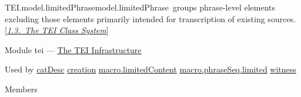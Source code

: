 \begin{reflist}
\item[]\begin{specHead}{TEI.model.limitedPhrase}{model.limitedPhrase} groups phrase-level elements excluding those elements primarily intended for transcription of existing sources. [\textit{\hyperref[STEC]{1.3.\ The TEI Class System}}]\end{specHead} 
    \item[{Module}]
  tei — \hyperref[ST]{The TEI Infrastructure}
    \item[{Used by}]
  \hyperref[TEI.catDesc]{catDesc} \hyperref[TEI.creation]{creation} \hyperref[TEI.macro.limitedContent]{macro.limitedContent} \hyperref[TEI.macro.phraseSeq.limited]{macro.phraseSeq.limited} \hyperref[TEI.witness]{witness}
    \item[{Members}]

\end{reflist}
